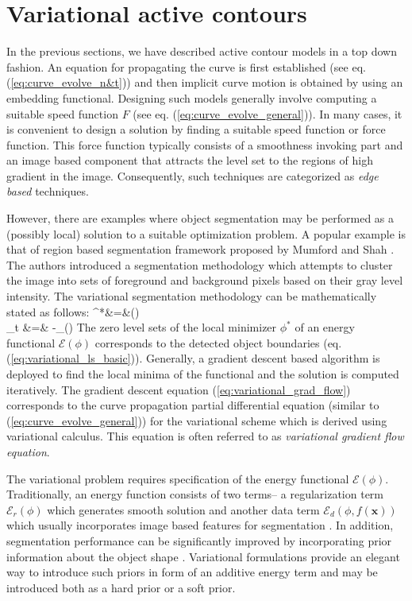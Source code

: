 \section{Variational active contours}

In the previous sections, we have described active contour models in a top down fashion. An equation for propagating the curve is first established (see eq. (\ref{eq:curve_evolve_n&t})) and then implicit curve motion is obtained by using an embedding functional. Designing such models generally involve computing a suitable speed function $F$ (see eq. (\ref{eq:curve_evolve_general})). In many cases, it is convenient to design a solution by finding a suitable speed function or force function. This force function typically consists of a smoothness invoking part and an image based component that attracts the level set to the regions of high gradient in the image\cite{malladi_sethian,caselles_geodesic}. Consequently, such techniques are categorized as  \textit{edge based} techniques.

However, there are examples where object segmentation may be performed as a (possibly local) solution to a suitable optimization problem. A popular example is that of region based segmentation framework proposed by Mumford and Shah \cite{mumford_shah}. The authors introduced a segmentation methodology which attempts to cluster the image into sets of foreground and background pixels based on their gray level intensity.
The variational segmentation methodology can be mathematically stated as follows:
\bea
\phi^*&=&\underset{\phi}{\arg\!\min}\;(\phi) \label{eq:variational_ls_basic}
\\
\phi_t &=& -\nabla_{\phi}\;(\phi)
\label{eq:variational_grad_flow}
\eea
The zero level sets of the local minimizer $\phi^*$ of an energy functional $\mathcal{E}(\phi)$ corresponds to the detected object boundaries (eq. (\ref{eq:variational_ls_basic})). Generally, a gradient descent based algorithm is deployed to find the local minima of the functional and the solution is computed iteratively. The gradient descent equation (\ref{eq:variational_grad_flow}) corresponds to the curve propagation partial differential equation (similar to (\ref{eq:curve_evolve_general})) for the variational scheme which is derived using variational calculus\cite{calc_of_var}. This equation is often referred to as \textit{variational gradient flow equation}. 

The variational problem requires specification of the energy functional $\mathcal{E}(\phi)$. Traditionally, an energy function consists of two terms-- a regularization term $\mathcal{E}_r(\phi)$ which generates smooth solution and another data term $\mathcal{E}_d(\phi,f(\textbf{x}))$ which usually incorporates image based features for segmentation \cite{zhao_variational,chan_vese,bernard_splinedCV,lankton_localCV}. In addition, segmentation performance can be significantly improved by incorporating prior information about the object shape . Variational formulations provide an elegant way to introduce such priors in form of an additive energy term and may be introduced both as a hard prior\cite{chan_LS_shape,cremers2007review,foulonneau2006affine,gooya2008variational} or a soft prior\cite{nain2004vessel}.

